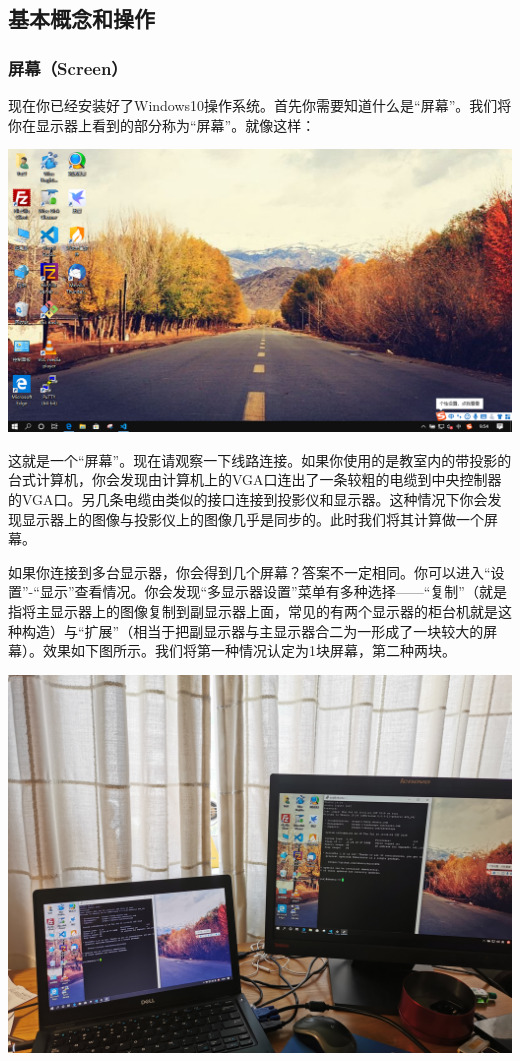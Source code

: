 \subsection{基本概念和操作}
\subsubsection{屏幕（Screen）}
现在你已经安装好了Windows10操作系统。首先你需要知道什么是“屏幕”。我们将你在显示器上看到的部分称为“屏幕”。就像这样：
\begin{center}
	\includegraphics[scale=0.5]{pic/screen}
\end{center} \par
这就是一个“屏幕”。现在请观察一下线路连接。如果你使用的是教室内的带投影的台式计算机，你会发现由计算机上的VGA口连出了一条较粗的电缆到中央控制器的VGA口。另几条电缆由类似的接口连接到投影仪和显示器。这种情况下你会发现显示器上的图像与投影仪上的图像几乎是同步的。此时我们将其计算做一个屏幕。\par
如果你连接到多台显示器，你会得到几个屏幕？答案不一定相同。你可以进入“设置”-“显示”查看情况。你会发现“多显示器设置”菜单有多种选择——“复制”（就是指将主显示器上的图像复制到副显示器上面，常见的有两个显示器的柜台机就是这种构造）与“扩展”（相当于把副显示器与主显示器合二为一形成了一块较大的屏幕）。效果如下图所示。我们将第一种情况认定为1块屏幕，第二种两块。
\begin{center}
	\includegraphics[scale=0.15]{pic/ScrCopy}
\end{center} 
